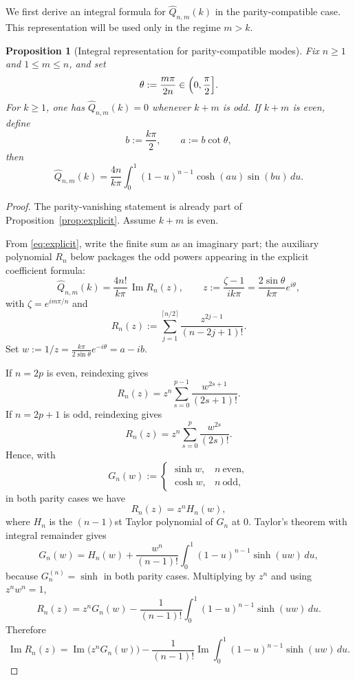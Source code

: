 \documentclass[10pt,a4paper]{amsart}
\newtheorem{proposition}[theorem]{Proposition}
\DeclareMathOperator{\ImagPart}{Im}
\renewcommand{\Im}{\ImagPart}
\begin{document}
We first derive an integral formula for $\widehat Q_{n,m}(k)$ in the parity-compatible case. This representation will be used only in the regime $m > k$.
\begin{proposition}[Integral representation for parity-compatible modes]\label{prop:integral-representation}
Fix $n\ge1$ and $1\le m\le n$, and set
\[
\theta:=\frac{m\pi}{2n}\in\Bigl(0,\frac{\pi}{2}\Bigr].
\]
For $k\ge1$, one has $\widehat Q_{n,m}(k)=0$ whenever $k+m$ is odd.
If $k+m$ is even, define
\[
b:=\frac{k\pi}{2},\qquad a:=b\cot\theta,
\]
then
\begin{equation}\label{eq:integral-rep}
\widehat Q_{n,m}(k)=
\frac{4n}{k\pi}\int_0^1 (1-u)^{n-1}\cosh(au)\sin(bu)\,du.
\end{equation}
\end{proposition}

\begin{proof}
The parity-vanishing statement is already part of
Proposition~\ref{prop:explicit}. Assume $k+m$ is even.

From \eqref{eq:explicit}, write the finite sum as an imaginary part; the auxiliary polynomial $R_n$ below packages the odd powers appearing in the explicit coefficient formula:
\begin{equation}
\label{eq:compact-pn}
\widehat Q_{n,m}(k)=\frac{4n!}{k\pi}\,\Im R_n(z),
\qquad
z:=\frac{\zeta-1}{ik\pi}
=\frac{2\sin\theta}{k\pi}e^{i\theta},
\end{equation}
with $\zeta=e^{im\pi/n}$ and
\[
R_n(z):=\sum_{j=1}^{\lceil n/2\rceil}\frac{z^{2j-1}}{(n-2j+1)!}.
\]
Set $w:=1/z=\frac{k\pi}{2\sin\theta}e^{-i\theta}=a-ib$.

If $n=2p$ is even, reindexing gives
\[
R_n(z)=z^n\sum_{s=0}^{p-1}\frac{w^{2s+1}}{(2s+1)!}.
\]
If $n=2p+1$ is odd, reindexing gives
\[
R_n(z)=z^n\sum_{s=0}^{p}\frac{w^{2s}}{(2s)!}.
\]
Hence, with
\[
G_n(w):=
\begin{cases}
\sinh w,& n\ \text{even},\\
\cosh w,& n\ \text{odd},
\end{cases}
\]
in both parity cases we have
\[
R_n(z)=z^nH_n(w),
\]
where $H_n$ is the $(n-1)$st Taylor polynomial of $G_n$ at $0$.
Taylor's theorem with integral remainder gives
\[
G_n(w) = H_n(w)+\frac{w^n}{(n-1)!}\int_0^1(1-u)^{n-1}\sinh(uw)\,du,
\]
because $G_n^{(n)}=\sinh$ in both parity cases.
Multiplying by $z^n$ and using $z^n w^n=1$,
\[
R_n(z) = z^nG_n(w)-\frac{1}{(n-1)!}\int_0^1(1-u)^{n-1}\sinh(uw)\,du.
\]
Therefore
\begin{equation}\label{eq:im-split}
\Im R_n(z)=\Im\!\bigl(z^nG_n(w)\bigr)
-\frac{1}{(n-1)!}\Im\!\int_0^1(1-u)^{n-1}\sinh(uw)\,du.
\end{equation}




\end{proof}
\end{document}
